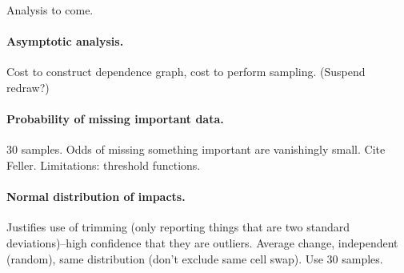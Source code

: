 Analysis to come.

\paragraph{Asymptotic analysis.}

Cost to construct dependence graph, cost to perform sampling. (Suspend redraw?)

\paragraph{Probability of missing important data.}

30 samples. Odds of missing something important are vanishingly small.
Cite Feller. Limitations: threshold functions.

\paragraph{Normal distribution of impacts.}

Justifies use of trimming (only reporting things that are two standard
deviations)--high confidence that they are outliers.  Average change,
independent (random), same distribution (don't exclude same cell
swap). Use 30 samples.

